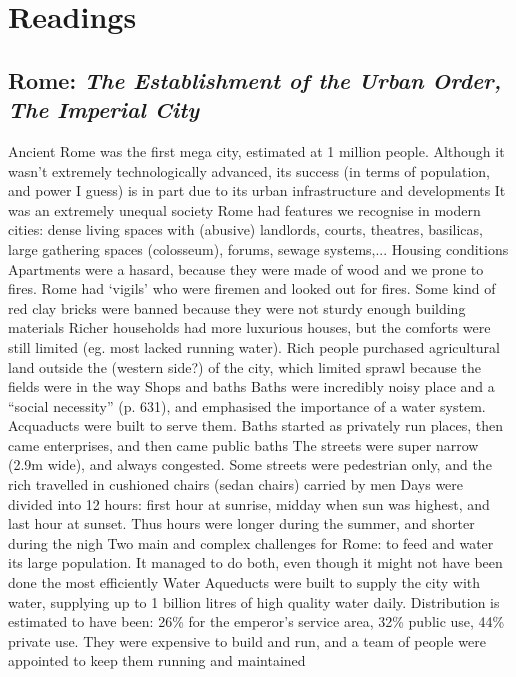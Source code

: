\documentclass{article}
\begin{document}
\section{Readings}

\subsection{Rome: \textit{The Establishment of the Urban Order, The Imperial City} \parencite{hall1998cities}}

\begin{outline}
	\1 Ancient Rome was the first mega city, estimated at 1 million people. Although it wasn't extremely technologically advanced, its success (in terms of population, and power I guess) is in part due to its urban infrastructure and developments
	\1 It was an extremely unequal society
	\1 Rome had features we recognise in modern cities: dense living spaces with (abusive) landlords, courts, theatres, basilicas, large gathering spaces (colosseum), forums, sewage systems,...
	\1 Housing conditions
		\2 Apartments were a hasard, because they were made of wood and we prone to fires. Rome had `vigils' who were firemen and looked out for fires. Some kind of red clay bricks were banned because they were not sturdy enough building materials
		\2 Richer households had more luxurious houses, but the comforts were still limited (eg. most lacked running water). Rich people purchased agricultural land outside the (western side?) of the city, which limited sprawl because the fields were in the way
	\1 Shops and baths
		\2 Baths were incredibly noisy place and a ``social necessity'' (p. 631), and emphasised the importance of a water system. Acquaducts were built to serve them. Baths started as privately run places, then came enterprises, and then came public baths
		\2 The streets were super narrow (2.9m wide), and always congested. Some streets were pedestrian only, and the rich travelled in cushioned chairs (sedan chairs) carried by men
		\2 Days were divided into 12 hours: first hour at sunrise, midday when sun was highest, and last hour at sunset. Thus hours were longer during the summer, and shorter during the nigh
	\1 Two main and complex challenges for Rome: to feed and water its large population. It managed to do both, even though it might not have been done the most efficiently
	\1 Water
		\2 Aqueducts were built to supply the city with water, supplying up to 1 billion litres of high quality water daily. Distribution is estimated to have been: 26\% for the emperor's service area, 32\% public use, 44\% private use. They were expensive to build and run, and a team of people were appointed to keep them running and maintained

\end{outline}
\end{document}
